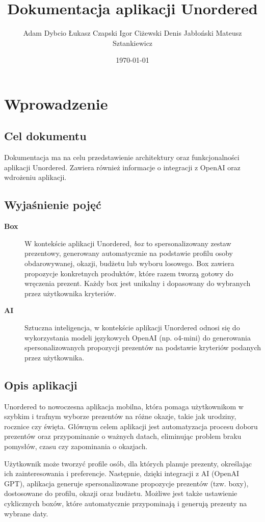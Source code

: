 \documentclass[a4paper, 12pt]{article}
\title{Dokumentacja aplikacji Unordered}
\author{Adam Dybcio\endline
        Łukasz Czapski\endline
        Igor Ciżewski\endline
        Denis Jabłoński\endline
        Mateusz Sztankiewicz}
\date{\today}
\begin{document}
\maketitle
\newpage
\tableofcontents
\newpage

\section{Wprowadzenie}
\subsection{Cel dokumentu}
Dokumentacja ma na celu przedstawienie architektury oraz funkcjonalności aplikacji Unordered.
Zawiera również informacje o integracji z OpenAI oraz wdrożeniu aplikacji.

\subsection{Wyjaśnienie pojęć}

\begin{description}
    \item[\textbf{Box}] W kontekście aplikacji Unordered, \emph{box} to spersonalizowany zestaw prezentowy, generowany automatycznie na podstawie profilu osoby obdarowywanej, okazji, budżetu lub wyboru losowego. Box zawiera propozycje konkretnych produktów, które razem tworzą gotowy do wręczenia prezent. Każdy box jest unikalny i dopasowany do wybranych przez użytkownika kryteriów.

    \item[\textbf{AI}] Sztuczna inteligencja, w kontekście aplikacji Unordered odnosi się do wykorzystania modeli językowych OpenAI (np. o4-mini) do generowania spersonalizowanych propozycji prezentów na podstawie kryteriów podanych przez użytkownika.
\end{description}

\newpage
\subsection{Opis aplikacji}
Unordered to nowoczesna aplikacja mobilna, która pomaga użytkownikom w szybkim i trafnym wyborze prezentów na różne okazje,
takie jak urodziny, rocznice czy święta. Głównym celem aplikacji jest automatyzacja procesu doboru prezentów oraz
przypominanie o ważnych datach, eliminując problem braku pomysłów, czasu czy zapominania o okazjach.

Użytkownik może tworzyć profile osób, dla których planuje prezenty, określając ich zainteresowania i preferencje.
Następnie, dzięki integracji z AI (OpenAI GPT), aplikacja generuje spersonalizowane propozycje prezentów (tzw. boxy),
dostosowane do profilu, okazji oraz budżetu. Możliwe jest także ustawienie cyklicznych boxów, które automatycznie
przypominają i generują prezenty na wybrane daty.
\end{document}
